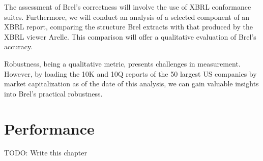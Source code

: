 The assessment of Brel's correctness will involve the use of XBRL conformance suites. 
Furthermore, we will conduct an analysis of a selected component of an XBRL report, 
comparing the structure Brel extracts with that produced by the XBRL viewer Arelle. 
This comparison will offer a qualitative evaluation of Brel's accuracy.

Robustness, being a qualitative metric, presents challenges in measurement. 
However, by loading the 10K and 10Q reports of the 50 largest US companies by market capitalization as of the date of this analysis, 
we can gain valuable insights into Brel's practical robustness.





\section{Performance}
\label{sec:performance}

TODO: Write this chapter



